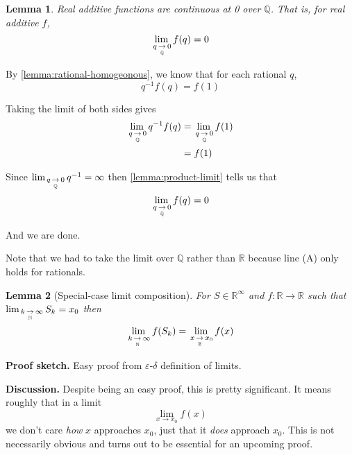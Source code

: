 \documentclass{article}
\theoremstyle{mytheoremstyle}
\newtheorem{lemma}{Lemma}
\renewenvironment{proof}[1][\proofname]{\noindent{\bfseries #1. }}{\begin{flushright}\smiley\end{flushright}}
\newcommand{\discussion}{\noindent\textbf{Discussion.} }
\newcommand{\sketch}{\noindent\textbf{Proof sketch.} }
\newcommand{\R}{\mathbb R}
\newcommand{\N}{\mathbb Z}
\newcommand{\Q}{\mathbb Q}
\renewcommand{\N}{\mathbb N}
\begin{document}

\begin{lemma}
\label{lemma:rational-continuous-0}
Real additive functions are continuous at 0 over $\mathbb Q$. That is, for real additive $f$,
$$ \limx{\Q}{q}{0} f(q) = 0 $$
\end{lemma}

\begin{proof}
By \cref{lemma:rational-homogeonous}, we know that for each rational $q$,
\[ q^{-1} f(q) = f(1) \tag{A} \]

Taking the limit of both sides gives
\begin{align*}
    \limx{\Q}{q}{0} q^{-1} f(q) &= \limx{\Q}{q}{0} f(1) \\
    &= f(1)
\end{align*}

Since $\limx{\Q}{q}{0} q^{-1} = \infty$ then \cref{lemma:product-limit} tells us that
$$ \limx{\Q}{q}{0} f(q) = 0 $$

And we are done.

Note that we had to take the limit over $\Q$ rather than $\R$ because line (A) only holds for rationals.
\end{proof}


\begin{lemma}[Special-case limit composition]
\label{lemma:limit-composition}
For $S \in \mathbb R^\infty$ and $f : \mathbb R \to \mathbb R$ such that $\limx{\N}{k}{\infty} S_k = x_0$ then
$$ \limx{\N}{k}{\infty} f(S_k) = \limx{\R}{x}{x_0} f(x) $$
\end{lemma}

\sketch Easy proof from $\varepsilon$-$\delta$ definition of limits.

\discussion Despite being an easy proof, this is pretty significant. It means roughly that in a limit
$$ \lim_{x \to x_0} f(x) $$
we don't care \textit{how} $x$ approaches $x_0$, just that it \textit{does} approach $x_0$. This is not necessarily obvious and turns out to be essential for an upcoming proof.
\end{document}
